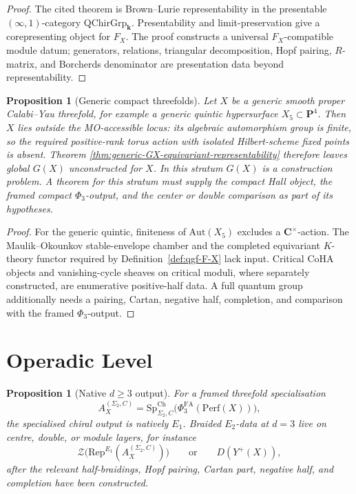 \documentclass[11pt]{amsart}
\newtheorem{proposition}[theorem]{Proposition}
\theoremstyle{definition}
\providecommand{\kk}{\mathbf{k}}
\providecommand{\Perf}{\mathrm{Perf}}
\providecommand{\Rep}{\mathrm{Rep}}
\providecommand{\Aut}{\mathrm{Aut}}
\providecommand{\QChirGrp}{\mathrm{QChirGrp}}
\providecommand{\SpCh}{\mathrm{Sp}^{\mathrm{Ch}}}
\providecommand{\bC}{\mathbf{C}}
\providecommand{\bP}{\mathbf{P}}
\providecommand{\Eone}{E_1}
\providecommand{\Etwo}{E_2}
\begin{document}
\begin{proof}
The cited theorem is Brown--Lurie representability in the presentable
\((\infty,1)\)-category \(\QChirGrp_\kk\).  Presentability and
limit-preservation give a corepresenting object for \(F_X\).  The proof
constructs a universal \(F_X\)-compatible module datum; generators,
relations, triangular decomposition, Hopf pairing, \(R\)-matrix, and
Borcherds denominator are presentation data beyond representability.
\end{proof}

\begin{proposition}[Generic compact threefolds]
\label{prop:generic-GX-unconstructed}
Let \(X\) be a generic smooth proper Calabi--Yau threefold, for
example a generic quintic hypersurface \(X_5\subset\bP^4\).  Then \(X\)
lies outside the MO-accessible locus: its algebraic automorphism group
is finite, so the required positive-rank torus action with isolated
Hilbert-scheme fixed points is absent.  Theorem
\ref{thm:generic-GX-equivariant-representability} therefore leaves
global \(G(X)\) unconstructed for \(X\).  In this stratum \(G(X)\) is a
construction problem.  A theorem for this stratum must supply the
compact Hall object, the framed compact \(\Phi_3\)-output, and the
center or double comparison as part of its hypotheses.
\end{proposition}

\begin{proof}
For the generic quintic, finiteness of \(\Aut(X_5)\) excludes a
\(\bC^\times\)-action.  The Maulik--Okounkov stable-envelope chamber
and the completed equivariant \(K\)-theory functor required by
Definition~\ref{def:qgf-F-X} lack input.  Critical CoHA objects and
vanishing-cycle sheaves on critical moduli, where separately
constructed, are enumerative positive-half data.  A full quantum group
additionally needs a pairing, Cartan, negative half, completion, and
comparison with the framed \(\Phi_3\)-output.
\end{proof}

\section{Operadic Level}

\begin{proposition}[Native \(d\geq 3\) output]
\label{prop:generic-GX-native-E1}
For a framed threefold specialisation
\[
  A_X^{(\Sigma_2,C)}
  =
  \SpCh_{\Sigma_2,C}\bigl(\Phi^{\mathrm{FA}}_3(\Perf(X))\bigr),
\]
the specialised chiral output is natively \(\Eone\).  Braided
\(\Etwo\)-data at \(d=3\) live on centre, double, or module layers,
for instance
\[
  \mathcal Z\bigl(\Rep^{\Eone}(A_X^{(\Sigma_2,C)})\bigr)
  \qquad\text{or}\qquad
  D(Y^+(X)),
\]
after the relevant half-braidings, Hopf pairing, Cartan part, negative
half, and completion have been constructed.
\end{proposition}
\end{document}
